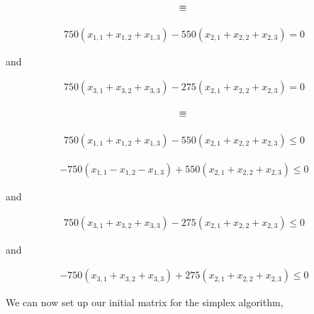 \documentclass{article}
\begin{document}
\[
\equiv\\
\]

\begin{align*}
    750(x_{1,1} + x_{1,2} + x_{1,3}) - 550(x_{2,1} + x_{2,2} + x_{2,3}) = 0
\end{align*}

and

\begin{align*}
    750(x_{3,1} + x_{3,2} + x_{3,3}) - 275(x_{2,1} + x_{2,2} + x_{2,3}) = 0
\end{align*}

\[
\equiv\\
\]

\begin{align*}
    750(x_{1,1} + x_{1,2} + x_{1,3}) - 550(x_{2,1} + x_{2,2} + x_{2,3}) \leq 0
\end{align*}

\begin{align*}
    -750(x_{1,1} - x_{1,2} - x_{1,3}) + 550(x_{2,1} + x_{2,2} + x_{2,3}) \leq 0
\end{align*}

and

\begin{align*}
    750(x_{3,1} + x_{3,2} + x_{3,3}) - 275(x_{2,1} + x_{2,2} + x_{2,3}) \leq 0
\end{align*}

and

\begin{align*}
    -750(x_{3,1} + x_{3,2} + x_{3,3}) + 275(x_{2,1} + x_{2,2} + x_{2,3}) \leq 0
\end{align*}

\begin{flushleft}

We can now set up our initial matrix for the simplex algorithm,

\end{flushleft}
\end{document}
